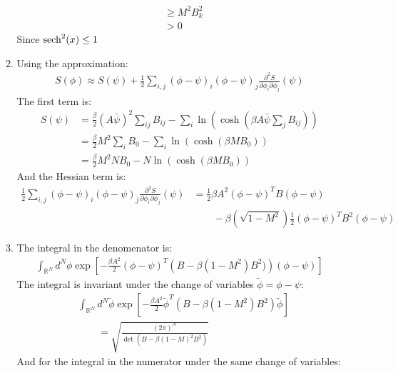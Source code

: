 \documentclass[12pt,a4]{article}
\begin{document}
\begin{enumerate}
\begin{enumerate}
\begin{align*}
                                                                  & \geq  M^2 B_{k}^2 \\
                                                                  & >  0 
        \end{align*}
        Since $\sech^2(x) \leq 1$
      \item
        Using the approximation:
        \begin{align*}
          S(\phi) \approx S(\psi) + \frac{1}{2}\sum_{i,j}(\phi - \psi)_i (\phi - \psi)_j \frac{\partial^2 S}{\partial \phi_i \partial \phi_j}(\psi)
        \end{align*}
        The first term is:
        \begin{align*}
          S(\psi) &= \frac{\beta}{2} (A\bar{\psi})^2 \sum_{i j} B_{ij} - \sum_i \ln(\cosh(\beta A\bar{\psi}\sum_jB_{ij}))\\
                  &= \frac{\beta}{2} M^2 \sum_{i } B_{0} - \sum_i \ln(\cosh(\beta M B_0))\\
                  &= \frac{\beta}{2} M^2 N B_{0} - N \ln(\cosh(\beta M B_0))
        \end{align*}
        And the Hessian term is:
        \begin{align*}
          \frac{1}{2}\sum_{i,j}(\phi - \psi)_i (\phi - \psi)_j \frac{\partial^2 S}{\partial \phi_i \partial \phi_j}(\psi) &= \frac{1}{2}\beta A^2 (\phi - \psi)^T B (\phi - \psi)  \\
               & \qquad   - \beta \left(\sqrt{1 - M^2}\right) \frac{1}{2}(\phi - \psi)^T B^2 (\phi - \psi)
        \end{align*}
      \item
        The integral in the denomenator is:
        \begin{align*}
          \int_{\mathbb{R}^N} d^N\phi \exp\left[-\frac{\beta A^2}{2}(\phi - \psi)^T\left(B  - \beta (1 - M^2)B^2)\right) (\phi - \psi)\right]
        \end{align*}
        The integral is invariant under the change of variables $\tilde\phi = \phi - \psi$:
        \begin{align*}
          &\int_{\mathbb{R}^N} d^N\tilde\phi \exp\left[-\frac{\beta A^2}{2}\tilde\phi^T\left(B  - \beta (1 - M^2)B^2\right) \tilde\phi\right]\\
          & \qquad = \sqrt{\frac{(2 \pi)^N}{\det\left( B  - \beta (1 - M)^2B^2\right)}}
        \end{align*}
        And for the integral in the numerator under the same change of variables:
        \begin{align*}

\end{align*}
\end{enumerate}
\end{enumerate}
\end{document}
